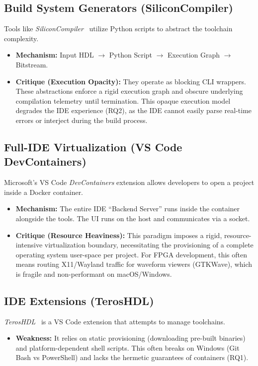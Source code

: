 \subsection{Build System Generators (SiliconCompiler)}
Tools like \textit{SiliconCompiler}~\cite{siliconcompiler} utilize Python scripts to abstract the toolchain complexity. 
\begin{itemize}
    \item \textbf{Mechanism:} Input HDL $\rightarrow$ Python Script $\rightarrow$ Execution Graph $\rightarrow$ Bitstream.
    \item \textbf{Critique (Execution Opacity):} They operate as blocking CLI wrappers. These abstractions enforce a rigid execution graph and obscure underlying compilation telemetry until termination. This opaque execution model degrades the IDE experience (RQ2), as the IDE cannot easily parse real-time errors or interject during the build process.
\end{itemize}

\subsection{Full-IDE Virtualization (VS Code DevContainers)}
Microsoft's VS Code \textit{DevContainers} extension allows developers to open a project inside a Docker container.
\begin{itemize}
    \item \textbf{Mechanism:} The entire IDE ``Backend Server'' runs inside the container alongside the tools. The UI runs on the host and communicates via a socket.
    \item \textbf{Critique (Resource Heaviness):} This paradigm imposes a rigid, resource-intensive virtualization boundary, necessitating the provisioning of a complete operating system user-space per project. For FPGA development, this often means routing X11/Wayland traffic for waveform viewers (GTKWave), which is fragile and non-performant on macOS/Windows.
\end{itemize}

\subsection{IDE Extensions (TerosHDL)}
\textit{TerosHDL}~\cite{teroshdl} is a VS Code extension that attempts to manage toolchains.
\begin{itemize}
    \item \textbf{Weakness:} It relies on static provisioning (downloading pre-built binaries) and platform-dependent shell scripts. This often breaks on Windows (Git Bash vs PowerShell) and lacks the hermetic guarantees of containers (RQ1).
\end{itemize}

